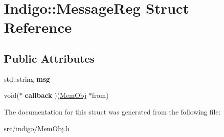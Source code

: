 \hypertarget{struct_indigo_1_1_message_reg}{}\section{Indigo\+:\+:Message\+Reg Struct Reference}
\label{struct_indigo_1_1_message_reg}
\subsection*{Public Attributes}
\begin{DoxyCompactItemize}
\item 
\mbox{\label{struct_indigo_1_1_message_reg_ae861511f1aaae96c3c4846cfa21e2643}} 
std\+::string {\bfseries msg}
\item 
\mbox{\label{struct_indigo_1_1_message_reg_a9da66eba103cd9085803686d5f180906}} 
void($\ast$ {\bfseries callback} )(\hyperlink{class_indigo_1_1_mem_obj}{Mem\+Obj} $\ast$from)
\end{DoxyCompactItemize}


The documentation for this struct was generated from the following file\+:\begin{DoxyCompactItemize}
\item 
src/indigo/Mem\+Obj.\+h\end{DoxyCompactItemize}
